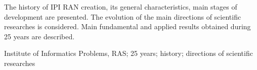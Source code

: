 The history of IPI RAN creation, its general characteristics,
main stages of development are presented. The evolution of the
main directions of scientific researches is considered. Main
fundamental and applied results obtained during 25 years are
described.

Institute of Informatics Problems, RAS; 25 years;
history; directions of scientific researches
